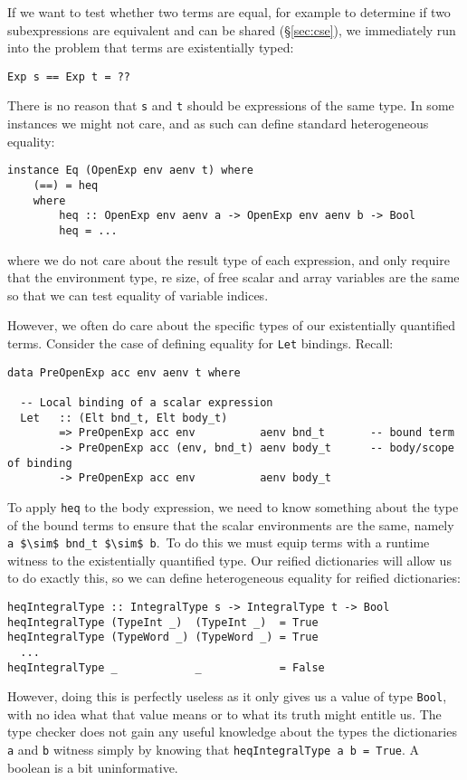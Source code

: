 If we want to test whether two terms are equal, for example to determine if two
subexpressions are equivalent and can be shared (\S\ref{sec:cse}), we
immediately run into the problem that terms are existentially typed:
%
\begin{lstlisting}[style=haskell]
Exp s == Exp t = ??
\end{lstlisting}
%
There is no reason that \texttt{s} and \texttt{t} should be expressions of the
same type. In some instances we might not care, and as such can define standard
heterogeneous equality:
%
\begin{lstlisting}[style=haskell]
instance Eq (OpenExp env aenv t) where
    (==) = heq
    where
        heq :: OpenExp env aenv a -> OpenExp env aenv b -> Bool
        heq = ...
\end{lstlisting}
%
where we do not care about the result type of each expression, and only require
that the environment type, re size, of free scalar and array variables are the
same so that we can test equality of variable indices.

However, we often do care about the specific types of our existentially
quantified terms. Consider the case of defining equality for \texttt{Let}
bindings. Recall:
%
\begin{lstlisting}[style=haskell]
data PreOpenExp acc env aenv t where

  -- Local binding of a scalar expression
  Let   :: (Elt bnd_t, Elt body_t)
        => PreOpenExp acc env          aenv bnd_t       -- bound term
        -> PreOpenExp acc (env, bnd_t) aenv body_t      -- body/scope of binding
        -> PreOpenExp acc env          aenv body_t
\end{lstlisting}
%
To apply \texttt{heq} to the body expression, we need to know something about
the type of the bound terms to ensure that the scalar environments are the same,
namely \lstinline[mathescape]{a $\sim$ bnd_t $\sim$ b}.\footnotemark\ To do
this we must equip terms with a runtime witness to the existentially quantified
type. Our reified dictionaries will allow us to do exactly this, so we can
define heterogeneous equality for reified dictionaries:
%
%
\begin{lstlisting}[style=haskell]
heqIntegralType :: IntegralType s -> IntegralType t -> Bool
heqIntegralType (TypeInt _)  (TypeInt _)  = True
heqIntegralType (TypeWord _) (TypeWord _) = True
  ...
heqIntegralType _            _            = False
\end{lstlisting}
%
However, doing this is perfectly useless as it only gives us a value of type
\texttt{Bool}, with no idea what that value means or to what its truth might
entitle us. The type checker does not gain any useful knowledge about the types
the dictionaries \texttt{a} and \texttt{b} witness simply by knowing that
\lstinline{heqIntegralType a b = True}. A boolean is a bit uninformative.

